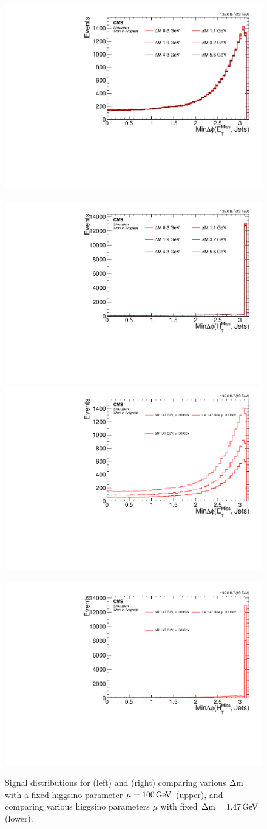 \begin{figure}[h]
\centering
\includegraphics[width=0.48\linewidth]{plots/signal_common_distributions_fixed_mu/none_MinDeltaPhiMetJets.pdf} \,
\includegraphics[width=0.48\linewidth]{plots/signal_common_distributions_fixed_mu/none_MinDeltaPhiMhtJets.pdf}  \\
\includegraphics[width=0.48\linewidth]{plots/signal_common_distributions_fixed_dm/none_MinDeltaPhiMetJets.pdf} \,
\includegraphics[width=0.48\linewidth]{plots/signal_common_distributions_fixed_dm/none_MinDeltaPhiMhtJets.pdf}  \\
\caption[Signal $\mindphimetjets$ and $\mindphimhtjets$ distributions]{ Signal distributions for \mindphimetjets (left) and \mindphimhtjets (right) comparing various $\Delta\mathrm{m}$ with a fixed higgsino parameter $\mu=100\,\text{Ge\hspace{-.08em}V}$ (upper), and comparing various higgsino parameters $\mu$ with fixed $\Delta\mathrm{m}=1.47\,\text{Ge\hspace{-.08em}V}$ (lower).}
\label{fig:signal-min-deltaphi-met-mht}
\end{figure}

